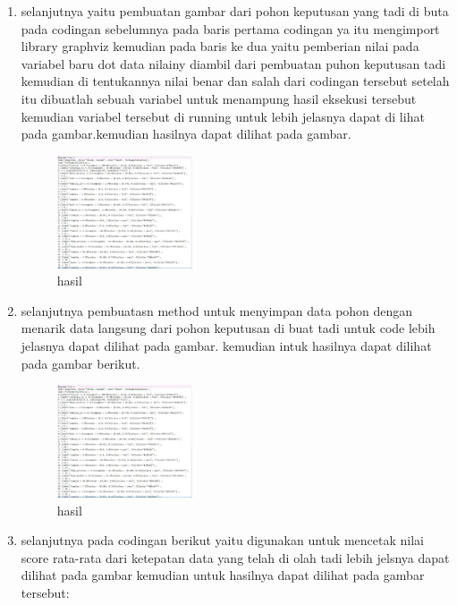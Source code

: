 \begin{enumerate}
\begin{figure}[H]
\end{figure}

\item selanjutnya yaitu pembuatan gambar dari pohon keputusan yang tadi di buta pada codingan sebelumnya pada baris pertama codingan ya itu mengimport library graphviz kemudian pada baris ke dua yaitu pemberian nilai pada variabel baru dot data nilainy diambil dari pembuatan puhon keputusan tadi kemudian di tentukannya nilai benar dan salah dari codingan tersebut setelah itu dibuatlah sebuah variabel untuk menampung hasil eksekusi tersebut kemudian variabel tersebut di running untuk lebih jelasnya dapat di lihat pada gambar.kemudian hasilnya dapat dilihat pada gambar.

\begin{figure}[H]
\centering
\includegraphics[width= 4cm]{figures/1174039/chapter2/15.JPG}
\caption{hasil}

\end{figure}


\item selanjutnya pembuatasn method untuk menyimpan data pohon dengan menarik data langsung dari pohon keputusan di buat tadi untuk code lebih jelasnya dapat dilihat pada gambar. kemudian intuk hasilnya dapat dilihat pada gambar berikut.

\begin{figure}[H]
\centering
\includegraphics[width= 4cm]{figures/1174039/chapter2/15.JPG}
\caption{hasil}

\end{figure}


\item selanjutnya pada codingan berikut yaitu digunakan untuk mencetak nilai score rata-rata dari ketepatan data yang telah di olah tadi lebih jelsnya dapat dilihat pada gambar kemudian untuk hasilnya dapat dilihat pada gambar tersebut:




\end{enumerate}
